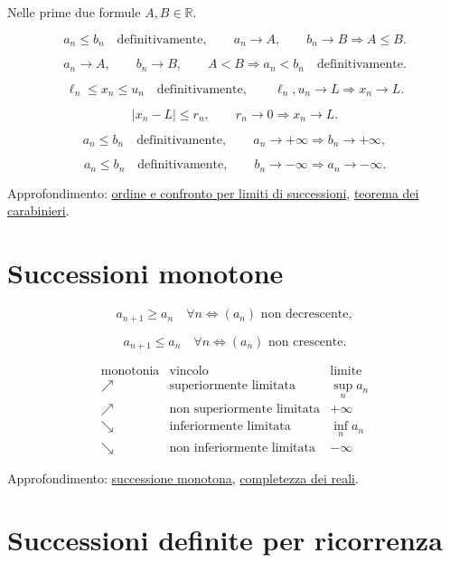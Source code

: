 Nelle prime due formule \(A,B\in\mathbb R\).

\[
a_n\le b_n\quad\text{definitivamente},
\qquad
a_n\to A,
\qquad
b_n\to B
\Longrightarrow
A\le B.
\]

\[
a_n\to A,
\qquad
b_n\to B,
\qquad
A<B
\Longrightarrow
a_n<b_n\quad\text{definitivamente}.
\]

\[
\ell_n\le x_n\le u_n\quad\text{definitivamente},
\qquad
\ell_n,u_n\to L
\Longrightarrow
x_n\to L.
\]

\[
|x_n-L|\le r_n,
\qquad
r_n\to0
\Longrightarrow
x_n\to L.
\]

\[
a_n\le b_n\quad\text{definitivamente},
\qquad
a_n\to+\infty
\Longrightarrow
b_n\to+\infty,
\]

\[
a_n\le b_n\quad\text{definitivamente},
\qquad
b_n\to-\infty
\Longrightarrow
a_n\to-\infty.
\]

Approfondimento: \href{https://ingegnerismo.it/matematica/ordine-e-confronto-per-limiti-di-successioni/}{ordine e confronto per limiti di successioni}, \href{https://ingegnerismo.it/matematica/teorema-dei-carabinieri/}{teorema dei carabinieri}.

\section{Successioni monotone}\label{successioni-monotone}

\[
a_{n+1}\ge a_n\quad\forall n
\Longleftrightarrow
(a_n)\text{ non decrescente},
\]

\[
a_{n+1}\le a_n\quad\forall n
\Longleftrightarrow
(a_n)\text{ non crescente}.
\]

\[
\begin{array}{c|c|c}
\text{monotonia}&\text{vincolo}&\text{limite}\\
\hline
\nearrow&\text{superiormente limitata}&\sup_n a_n\\
\nearrow&\text{non superiormente limitata}&+\infty\\
\searrow&\text{inferiormente limitata}&\inf_n a_n\\
\searrow&\text{non inferiormente limitata}&-\infty
\end{array}
\]

Approfondimento: \href{https://ingegnerismo.it/matematica/successione-monotona/}{successione monotona}, \href{https://ingegnerismo.it/matematica/completezza-dei-reali/}{completezza dei reali}.

\section{Successioni definite per ricorrenza}\label{successioni-definite-per-ricorrenza}

